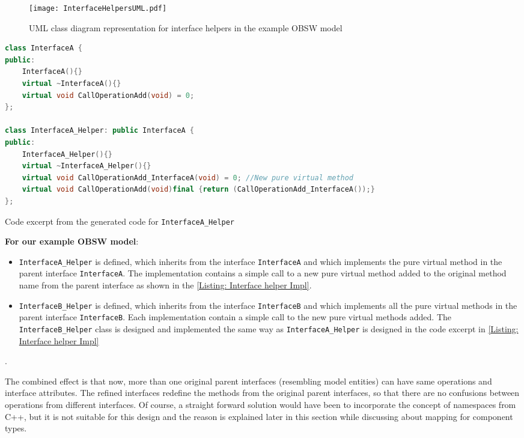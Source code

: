 \begin{figure}[h]
	\centering
	\texttt{[image: InterfaceHelpersUML.pdf]}
	\caption{UML class diagram representation for interface helpers in the example OBSW model}
	\label{fig: Interface helpers UML}
\end{figure}

\begin{Listing}
\begin{lstlisting}[language=C++]
class InterfaceA {
public:
	InterfaceA(){}
	virtual ~InterfaceA(){}
	virtual void CallOperationAdd(void) = 0;
};

class InterfaceA_Helper: public InterfaceA {
public:
	InterfaceA_Helper(){}
	virtual ~InterfaceA_Helper(){}
	virtual void CallOperationAdd_InterfaceA(void) = 0; //New pure virtual method
	virtual void CallOperationAdd(void)final {return (CallOperationAdd_InterfaceA());}
};
\end{lstlisting}
\caption{Code excerpt from the generated code for \texttt{InterfaceA\allowbreak\_Helper}}
\label{Listing: Interface helper Impl}
\end{Listing}

\textbf{For our example OBSW model}:
\begin{itemize}
\item \texttt{InterfaceA\allowbreak\_Helper} is defined, which inherits from the interface \texttt{InterfaceA} and which implements the pure virtual method in the parent interface \texttt{InterfaceA}. The implementation contains a simple call to a new pure virtual method added to the original method name from the parent interface as shown in the \cref{Listing: Interface helper Impl}.

\item \texttt{InterfaceB\allowbreak\_Helper} is defined, which inherits from the interface \texttt{InterfaceB} and which implements all the pure virtual methods in the parent interface \texttt{InterfaceB}. Each implementation contain a simple call to the new pure virtual methods added. The \texttt{InterfaceB\allowbreak\_Helper} class is designed and implemented the same way as \texttt{InterfaceA\allowbreak\_Helper} is designed in the code excerpt in \cref{Listing: Interface helper Impl}   
\end{itemize}.

The combined effect is that now, more than one original parent interfaces (resembling model entities) can have same operations and interface attributes. The refined interfaces redefine the methods from the original parent interfaces, so that there are no confusions between operations from different interfaces. Of course, a straight forward solution would have been to incorporate the concept of namespaces from C++, but it is not suitable for this design and the reason is explained later in this section while discussing about mapping for component types. 

